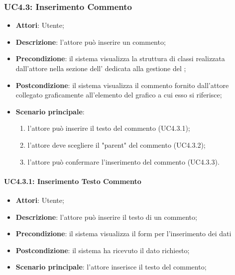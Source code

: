 \subsubsection{UC4.3: Inserimento Commento}
\label{UC4.3}
\begin{itemize}
\item \textbf{Attori}: Utente;
\item \textbf{Descrizione}: l'attore può inserire un commento;
\item \textbf{Precondizione}: il sistema visualizza la struttura di classi realizzata dall'attore nella sezione dell' dedicata alla gestione del ;
\item \textbf{Postcondizione}: il sistema visualizza il commento fornito dall'attore collegato graficamente all'elemento del grafico a cui esso si riferisce;	
\item \textbf{Scenario principale}:
\begin{enumerate}
\item l'attore può inserire il testo del commento (UC4.3.1);
\item l'attore deve scegliere il "parent" del commento (UC4.3.2);
\item l'attore può confermare l'inserimento del commento (UC4.3.3).
\end{enumerate}
\end{itemize}

\paragraph{UC4.3.1: Inserimento Testo Commento}
\label{UC4.3.1}
\begin{itemize}
\item \textbf{Attori}: Utente;
\item \textbf{Descrizione}: l'attore può inserire il testo di un commento;
\item \textbf{Precondizione}: il sistema visualizza il form per l'inserimento dei dati	
\item \textbf{Postcondizione}: il sistema ha ricevuto il dato richiesto;	
\item \textbf{Scenario principale}:
l'attore inserisce il testo del commento;
\end{itemize}


